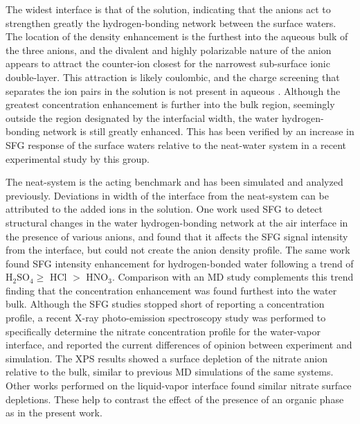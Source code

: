 
The widest interface is that of the \sodsul solution, indicating that the \sul anions act to strengthen greatly the hydrogen-bonding network between the surface waters. The location of the \sul density enhancement is the furthest into the aqueous bulk of the three anions, and the divalent and highly polarizable nature of the anion appears to attract the counter-ion closest for the narrowest sub-surface ionic double-layer. This attraction is likely coulombic, and the charge screening that separates the ion pairs in the \sodnit solution is not present in aqueous \sodsul. Although the greatest concentration enhancement is further into the bulk region, seemingly outside the region designated by the interfacial width, the water hydrogen-bonding network is still greatly enhanced. This has been verified by an increase in SFG response of the surface waters relative to the neat-water system in a recent experimental study by this group.\cite{McFearin2009}


The neat-\airwat system is the acting benchmark and has been simulated and analyzed previously.\cite{Wick2006c,Hore2008,Wick2008a} Deviations in width of the interface from the neat-\ctcwat system can be attributed to the added ions in the solution. One work used SFG to detect structural changes in the water hydrogen-bonding network at the air interface in the presence of various anions, and found that it affects the SFG signal intensity from the interface, but could not create the anion density profile\cite{Schnitzer2000}. The same work found SFG intensity enhancement for hydrogen-bonded water following a trend of H$_2$SO$_4\ge$ HCl $>$ HNO$_3$. Comparison with an \airwat MD study complements this trend finding that the \sul concentration enhancement was found furthest into the water bulk.\cite{Salvador2003} Although the SFG studies stopped short of reporting a concentration profile, a recent X-ray photo-emission spectroscopy study was performed to specifically determine the nitrate concentration profile for the water-vapor interface, and reported the current differences of opinion between experiment and simulation.\cite{Brown2009} The XPS results showed a surface depletion of the nitrate anion relative to the bulk, similar to previous MD simulations of the same systems. Other works performed on the liquid-vapor interface found similar nitrate surface depletions.\cite{Otten2007} These help to contrast the effect of the presence of an organic phase as in the present work. 

